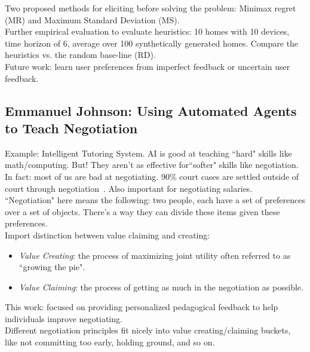 Two proposed methods for eliciting before solving the problem: Minimax regret (MR) and Maximum Standard Deviation (MS). \\

Further empirical evaluation to evaluate heuristics: 10 homes with 10 devices, time horizon of 6, average over 100 synthetically generated homes. Compare the heuristics vs. the random base-line (RD). \\

Future work: learn user preferences from imperfect feedback or uncertain user feedback.

\spacerule
\subsection{Emmanuel Johnson: Using Automated Agents to Teach Negotiation}

Example: Intelligent Tutoring System. AI is good at teaching ``hard" skills like math/computing. But! They aren't as effective for``softer" skills like negotiation. \\

In fact: most of us are bad at negotiating. 90\% court cases are settled outside of court through negotiation~\cite{eisenberg2009settlement}. Also important for negotiating salaries. \\

``Negotiation" here means the following: two people, each have a set of preferences over a set of objects. There's a way they can divide these items given these preferences. \\

Import distinction between value claiming and creating:
\begin{itemize}
    \item {\it Value Creating}: the process of maximizing joint utility often referred to as ``growing the pie".
    \item {\it Value Claiming}: the process of getting as much in the negotiation as possible.
\end{itemize}

This work: focused on providing personalized pedagogical feedback to help individuals improve negotiating. \\

Different negotiation principles fit nicely into value creating/claiming buckets, like not committing too early, holding ground, and so on. \\

